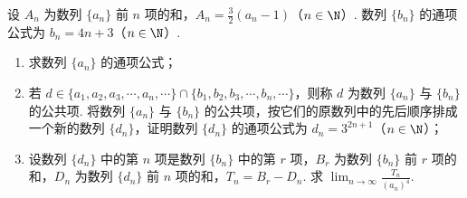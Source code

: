 \begin{problem}
设 \(A_{n}\) 为数列 \(\{a_{n}\}\) 前 \(n\) 项的和，\(A_{n}=\frac{3}{2}(a_{n}-1)\)（\(n\in\N\)）. 数列 \(\{b_{n}\}\) 的通项公式为 \(b_{n}=4n+3\)（\(n\in\N\)）.

\begin{enumerate}
\item 求数列 \(\{a_{n}\}\) 的通项公式；
\item 若 \(d\in\{a_{1}, a_{2}, a_{3}, \cdots, a_{n}, \cdots\}\cap\{b_{1}, b_{2}, b_{3}, \cdots, b_{n}, \cdots\}\)，则称 \(d\) 为数列 \(\{a_{n}\}\) 与 \(\{b_{n}\}\) 的公共项. 将数列 \(\{a_{n}\}\) 与 \(\{b_{n}\}\) 的公共项，按它们的原数列中的先后顺序排成一个新的数列 \(\{d_{n}\}\)，证明数列 \(\{d_{n}\}\) 的通项公式为 \(d_{n}=3^{2n+1}\)（\(n\in\N\)）；
\item 设数列 \(\{d_{n}\}\) 中的第 \(n\) 项是数列 \(\{b_{n}\}\) 中的第 \(r\) 项，\(B_{r}\) 为数列 \(\{b_{n}\}\) 前 \(r\) 项的和，\(D_{n}\) 为数列 \(\{d_{n}\}\) 前 \(n\) 项的和，\(T_{n}=B_{r}-D_{n}\). 求 \(\displaystyle\lim_{n\to\infty}\frac{T_{n}}{(a_{n})^{4}}\).
\end{enumerate}
\end{problem}

